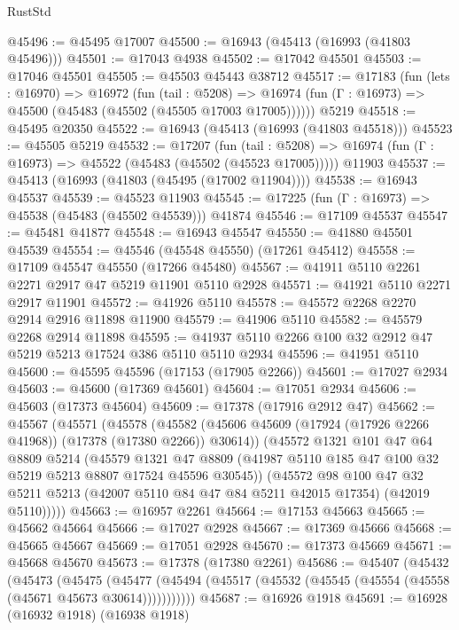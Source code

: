 \begin{lexlean}{RustStd}
\begin{coremodule}
@45496 := @45495 @17007
@45500 := @16943 (@45413 (@16993 (@41803 @45496)))
@45501 := @17043 @4938
@45502 := @17042 @45501
@45503 := @17046 @45501
@45505 := @45503 @45443 @38712
@45517 := @17183
    (fun (lets : @16970) =>
    @16972
      (fun (tail : @5208) =>
      @16974 (fun (Γ : @16973) => @45500 (@45483 (@45502 (@45505 @17003 @17005))))))
    @5219
@45518 := @45495 @20350
@45522 := @16943 (@45413 (@16993 (@41803 @45518)))
@45523 := @45505 @5219
@45532 := @17207
    (fun (tail : @5208) => @16974 (fun (Γ : @16973) => @45522 (@45483 (@45502 (@45523 @17005)))))
    @11903
@45537 := @45413 (@16993 (@41803 (@45495 (@17002 @11904))))
@45538 := @16943 @45537
@45539 := @45523 @11903
@45545 := @17225 (fun (Γ : @16973) => @45538 (@45483 (@45502 @45539))) @41874
@45546 := @17109 @45537
@45547 := @45481 @41877
@45548 := @16943 @45547
@45550 := @41880 @45501 @45539
@45554 := @45546 (@45548 @45550) (@17261 @45412)
@45558 := @17109 @45547 @45550 (@17266 @45480)
@45567 := @41911 @5110 @2261 @2271 @2917 @47 @5219 @11901 @5110 @2928
@45571 := @41921 @5110 @2271 @2917 @11901
@45572 := @41926 @5110
@45578 := @45572 @2268 @2270 @2914 @2916 @11898 @11900
@45579 := @41906 @5110
@45582 := @45579 @2268 @2914 @11898
@45595 := @41937 @5110 @2266 @100 @32 @2912 @47 @5219 @5213 @17524 @386 @5110 @5110 @2934
@45596 := @41951 @5110
@45600 := @45595 @45596 (@17153 (@17905 @2266))
@45601 := @17027 @2934
@45603 := @45600 (@17369 @45601)
@45604 := @17051 @2934
@45606 := @45603 (@17373 @45604)
@45609 := @17378 (@17916 @2912 @47)
@45662 := @45567
    (@45571
      (@45578
        (@45582 (@45606 @45609 (@17924 (@17926 @2266 @41968)) (@17378 (@17380 @2266)) @30614))
        (@45572
          @1321
          @101
          @47
          @64
          @8809
          @5214
          (@45579
            @1321
            @47
            @8809
            (@41987 @5110 @185 @47 @100 @32 @5219 @5213 @8807 @17524 @45596 @30545))
          (@45572
            @98
            @100
            @47
            @32
            @5211
            @5213
            (@42007 @5110 @84 @47 @84 @5211 @42015 @17354)
            (@42019 @5110)))))
@45663 := @16957 @2261
@45664 := @17153 @45663
@45665 := @45662 @45664
@45666 := @17027 @2928
@45667 := @17369 @45666
@45668 := @45665 @45667
@45669 := @17051 @2928
@45670 := @17373 @45669
@45671 := @45668 @45670
@45673 := @17378 (@17380 @2261)
@45686 := @45407
    (@45432
      (@45473
        (@45475
          (@45477 (@45494 (@45517 (@45532 (@45545 (@45554 (@45558 (@45671 @45673 @30614)))))))))))
@45687 := @16926 @1918
@45691 := @16928 (@16932 @1918) (@16938 @1918)

\end{coremodule}
\end{lexlean}
